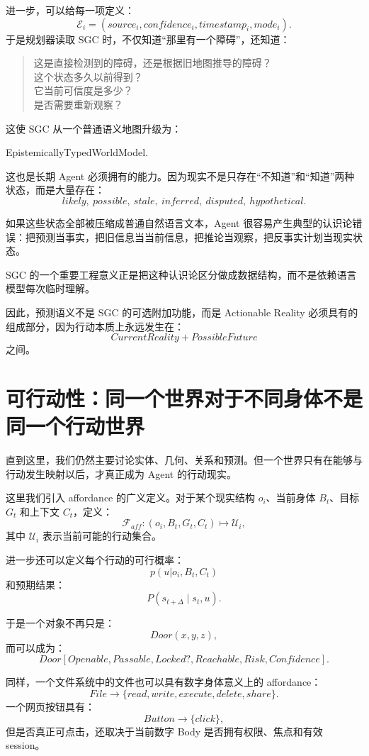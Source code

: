 进一步，可以给每一项定义：
\[
\mathcal E_i
=
(
source_i,
confidence_i,
timestamp_i,
mode_i
).
\]
于是规划器读取 SGC 时，不仅知道“那里有一个障碍”，还知道：
\begin{quote}
这是直接检测到的障碍，还是根据旧地图推导的障碍？\\
这个状态多久以前得到？\\
它当前可信度是多少？\\
是否需要重新观察？
\end{quote}

这使 SGC 从一个普通语义地图升级为：
\begin{statementbox}
EpistemicallyTypedWorldModel.
\end{statementbox}

这也是长期 Agent 必须拥有的能力。因为现实不是只存在“不知道”和“知道”两种状态，而是大量存在：
\[
likely,\ possible,\ stale,\ inferred,\ disputed,\ hypothetical.
\]

如果这些状态全部被压缩成普通自然语言文本，Agent 很容易产生典型的认识论错误：把预测当事实，把旧信息当当前信息，把推论当观察，把反事实计划当现实状态。

SGC 的一个重要工程意义正是把这种认识论区分做成数据结构，而不是依赖语言模型每次临时理解。

因此，预测语义不是 SGC 的可选附加功能，而是 Actionable Reality 必须具有的组成部分，因为行动本质上永远发生在：
\[
CurrentReality
+
PossibleFuture
\]
之间。

\section{可行动性：同一个世界对于不同身体不是同一个行动世界}

直到这里，我们仍然主要讨论实体、几何、关系和预测。但一个世界只有在能够与行动发生映射以后，才真正成为 Agent 的行动现实。

这里我们引入 affordance 的广义定义。对于某个现实结构 \(o_i\)、当前身体 \(B_t\)、目标 \(G_t\) 和上下文 \(C_t\)，定义：
\[
\mathcal{F}_{aff}
:
(o_i,B_t,G_t,C_t)
\mapsto
\mathcal U_i,
\]
其中 \(\mathcal U_i\) 表示当前可能的行动集合。

进一步还可以定义每个行动的可行概率：
\[
p(u|o_i,B_t,C_t)
\]
和预期结果：
\[
P
\left(
s_{t+\Delta}
\mid
s_t,u
\right).
\]

于是一个对象不再只是：
\[
Door(
x,y,z
),
\]
而可以成为：
\[
Door
\left[
Openable,
Passable,
Locked?,
Reachable,
Risk,
Confidence
\right].
\]

同样，一个文件系统中的文件也可以具有数字身体意义上的 affordance：
\[
File
\rightarrow
\{
read,
write,
execute,
delete,
share
\}.
\]
一个网页按钮具有：
\[
Button
\rightarrow
\{
click
\},
\]
但是否真正可点击，还取决于当前数字 Body 是否拥有权限、焦点和有效 session。

